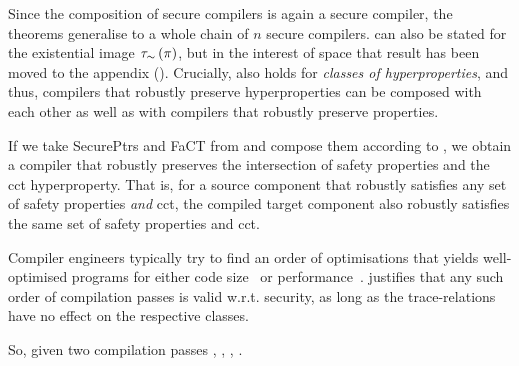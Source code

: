 \documentclass[dvipsnames,conference]{IEEEtran}
\theoremstyle{definition}
\begin{document}
Since the composition of secure compilers is again a secure compiler, the theorems generalise to a whole chain of $n$ secure compilers. 
% 
 can also be stated for the existential image $\tau_\sim\left(\mathsf{\pi}\right)$, but in the interest of space that result has been moved to the appendix ().
% 
Crucially,  also holds for \emph{classes of hyperproperties}, and thus, compilers that robustly preserve hyperproperties can be composed with each other as well as with compilers that robustly preserve properties.
% 
% 


If we take SecurePtrs and FaCT from  and compose them according to , we obtain a compiler that robustly preserves the intersection of safety properties and the \gls*{cct} hyperproperty. 
That is, for a source component that robustly satisfies any set of safety properties {\em and} \gls*{cct}, the compiled target component also robustly satisfies the same set of safety properties and \gls*{cct}.

Compiler engineers typically try to find an order of optimisations that yields well-optimised programs for either code size~\cite{cooper1999geneticphases} or performance~\cite{kulkarni2006exhaustivephase}.
 justifies that any such order of compilation passes is valid w.r.t. security, as long as the trace-relations have no effect on the respective classes.

So, given two compilation passes , , , .
% 
\end{document}
